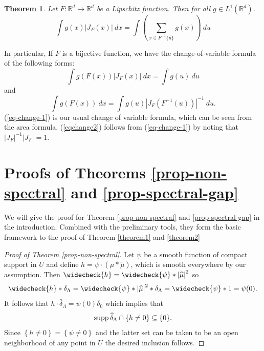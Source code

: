 \documentclass[12pt,a4paper,oneside]{amsart}
\newtheorem{theorem}{Theorem}
\theoremstyle{definition}
\newcommand{\Abs}[1]{{\left|{#1}\right|}}
\newcommand{\Set}[1]{{\left\{{#1}\right\}}}
\newcommand{\RR}{{\mathbb R}}
\newcommand{\supp}{{\rm supp\,}}
\newcommand{\ft}[1]{\widehat{#1}}
\newcommand{\tf}[1]{\widecheck{#1}}
\newcommand{\wt}[1]{\widetilde{#1}}
\newcommand{\red}[1]{\textcolor{red}{{#1}}}
\newcounter{rem}
\begin{document}
\begin{theorem}\label{area formula}
    Let $F: \RR^d\to\RR^d$ be a Lipschitz function. Then for all $g\in L^1(\RR^d)$. 
    $$
    \int g(x)|J_F(x)|~dx =  \int \left(\sum_{x\in F^{-1}\{u\}} g(x)\right) ~du
    $$
\end{theorem}
In particular, If $F$ is a bijective function, we have the change-of-variable formula of the following forms:
\begin{equation}\label{eq-change-1}
    \int g(F(x))|J_F(x)|~dx = \int g(u)~du
\end{equation}
and 
\begin{equation}\label{eqchange2}
    \int g(F(x))~dx = \int  g(u) | J_{F}(F^{-1}(u))|^{-1}~du.
\end{equation}
(\ref{eq-change-1}) is our usual change of variable formula, which can be seen from the area formula. (\ref{eqchange2}) follows from (\ref{eq-change-1}) by noting that $|J_F|^{-1}|J_F| = 1$. 


\section{Proofs of Theorems \ref{prop-non-spectral} and \ref{prop-spectral-gap}} \label{s:thm34} We will give the proof for Theorem \ref{prop-non-spectral} and \ref{prop-spectral-gap} in the introduction. Combined with the preliminary tools, they form the basic framework to the proof of Theorem \ref{theorem1} and \ref{theorem2}



\begin{proof}  [Proof of Theorem \ref{prop-non-spectral}] Let $\psi$ be a smooth function of compact support in $U$ and define $h = \psi\cdot (\mu*\wt\mu)$, which is smooth everywhere by our assumption. Then $\tf h = \tf\psi * \Abs{\ft\mu}^2$ so
$$
\tf h*\delta_\Lambda = \tf\psi*\Abs{\ft\mu}^2*\delta_\Lambda = \tf\psi * 1 = \psi(0).
$$
It follows that $h \cdot \ft\delta_\Lambda = \psi(0)\delta_0$ which implies that
$$
\supp\ft\delta_\Lambda \cap \Set{h \neq 0} \subseteq \Set{0}.
$$
Since $\Set{h \neq 0} = \Set{\psi \neq 0}$ and the latter set can be taken to be an open neighborhood of any point in $U$ the desired inclusion follows.
\end{proof}
\end{document}
